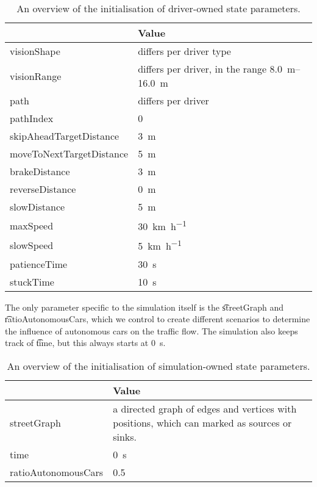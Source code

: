\begin{table}
	\centering
	\begin{tabularx}{\textwidth}{>{\ttfamily}lX}
		\toprule
		\normalfont{Parameter}	& Value \\  
		\midrule
		visionShape 			
			& differs per driver type \\
		visionRange 			
			& differs per driver, in the range \SIrange{8.0}{16.0}{\meter} \\
		path
			& differs per driver \\
		pathIndex
			& 0 \\
		skipAheadTargetDistance
			& \si{3\meter} \\
		moveToNextTargetDistance
			& \si{5\meter} \\
		brakeDistance
			& \si{3\meter} \\
		reverseDistance
			& \si{0\meter} \\
		slowDistance
			& \si{5\meter} \\
		maxSpeed
			& \si{30\kilo\meter\per\hour}\\
		slowSpeed
			& \si{5\kilo\meter\per\hour} \\
		patienceTime
			& \si{30\second} \\
		stuckTime
			& \si{10\second} \\
		\bottomrule
	\end{tabularx}
	\caption{An overview of the initialisation of driver-owned state parameters.}
	\label{tab:par:method:model:details:init:driver:value}
\end{table}


The only parameter specific to the simulation itself is the \t{streetGraph} and \t{ratioAutonomousCars}, which we control to create different scenarios to determine the influence of autonomous cars on the traffic flow. The simulation also keeps track of \t{time}, but this always starts at \si{0\second}.

\begin{table}
	\centering
	\begin{tabularx}{\textwidth}{>{\ttfamily}lX}
		\toprule
		\normalfont{Parameter}	& Value \\  
		\midrule
		streetGraph
			& a directed graph of edges and vertices with positions, which can marked as sources or sinks. \\
		time 
			& \si{0\second} \\
		ratioAutonomousCars
			& 0.5 \\
		\bottomrule
	\end{tabularx}
	\caption{An overview of the initialisation of simulation-owned state parameters.}
	\label{tab:par:method:model:details:init:simulation:value}
\end{table}

